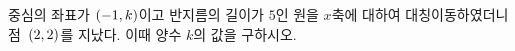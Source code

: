중심의 좌표가 $(-1{,}\mkern3mu\mathopen{}k)$이고 반지름의 길이가 $5$인 원을 $x$축에 대하여 대칭이동하였더니 점~$(2{,}\mkern3mu\mathopen{}2)$를 지났다. 이때 양수 $k$의 값을 구하시오.
